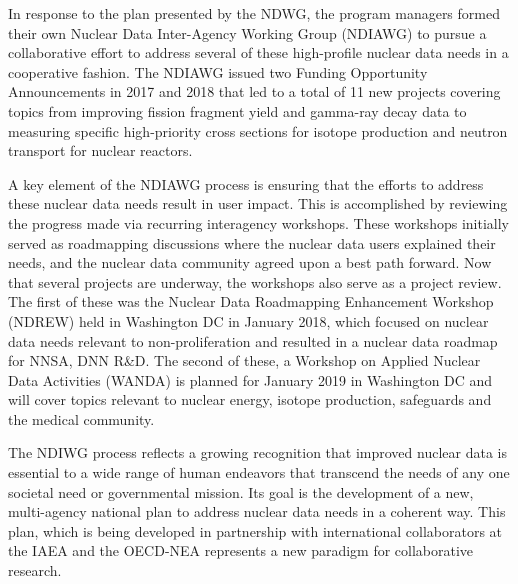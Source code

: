 \documentclass[letterpaper,draft]{ar-1col}
\begin{document}
In response to the plan presented by the NDWG, the program managers formed their own Nuclear Data Inter-Agency Working Group (NDIAWG) to pursue a collaborative effort to address several of these high-profile nuclear data needs in a cooperative fashion.  The NDIAWG issued two Funding Opportunity Announcements in 2017 and 2018 that led to a total of 11 new projects covering topics from improving fission fragment yield and gamma-ray decay data to measuring specific high-priority cross sections for isotope production and neutron transport for nuclear reactors.   

A key element of the NDIAWG process is ensuring that the efforts to address these nuclear data needs result in user impact.  This is accomplished by reviewing the progress made via recurring interagency workshops.  These workshops initially served as roadmapping discussions where the nuclear data users explained their needs, and the nuclear data community agreed upon a best path forward.  Now that several projects are underway, the workshops also serve as a project review. The first of these was the Nuclear Data Roadmapping Enhancement Workshop (NDREW) held in Washington DC in January 2018, which focused on nuclear data needs relevant to non-proliferation \cite{Ndr18} and resulted in a nuclear data roadmap for NNSA, DNN R\&D.  The second of these, a Workshop on Applied Nuclear Data Activities (WANDA) is planned for January 2019 in Washington DC and will cover topics relevant to nuclear energy, isotope production, safeguards and the medical community.  

The NDIWG process reflects a growing recognition that improved nuclear data is essential to a wide range of human endeavors that transcend the needs of any one societal need or governmental mission.  Its goal is the development of a new, multi-agency national plan to address nuclear data needs in a coherent way.  This plan, which is being developed in partnership with international collaborators at the IAEA and the OECD-NEA represents a new paradigm for collaborative research.  
% 
% 
% 
\end{document}
